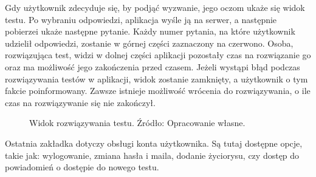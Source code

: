 \documentclass[twoside]{projektInzynierskiMS}
\numberwithin{figure}{section}
\begin{document}
\newpage
Gdy użytkownik zdecyduje się, by podjąć wyzwanie, jego oczom ukaże się widok testu. Po wybraniu odpowiedzi, aplikacja wyśle ją na serwer, a następnie pobierze\linebreak i ukaże następne pytanie. Każdy numer pytania, na które użytkownik udzielił odpowiedzi, zostanie w górnej części zaznaczony na czerwono. Osoba, rozwiązująca test, widzi w dolnej części aplikacji pozostały czas na rozwiązanie go oraz ma możliwość jego zakończenia przed czasem. Jeżeli wystąpi błąd podczas rozwiązywania testów w aplikacji, widok zostanie zamknięty, a użytkownik o tym fakcie poinformowany. Zawsze istnieje możliwość wrócenia do rozwiązywania, o ile czas na rozwiązywanie się nie zakończył.

\begin{figure}[h!]
\caption{Widok rozwiązywania testu. Źródło: Opracowanie własne.}
\label{fig:mobile_quiz_solver}
\end{figure}
\newpage
Ostatnia zakładka dotyczy obsługi konta użytkownika. Są tutaj dostępne opcje, takie jak: wylogowanie, zmiana hasła i maila, dodanie życiorysu, czy dostęp do powiadomień o dostępie do nowego testu.
\end{document}
